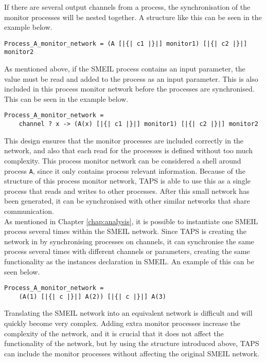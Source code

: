 If there are several output channels from a process, the synchronisation of the monitor processes will be nested together. A structure like this can be seen in the example below.
\begin{verbatim}
Process_A_monitor_network = (A [|{| c1 |}|] monitor1) [|{| c2 |}|] monitor2
\end{verbatim}
As mentioned above, if the SMEIL process contains an input parameter, the value must be read and added to the process as an input parameter. This is also included in this process monitor network before the processes are synchronised. This can be seen in the example below.
\begin{verbatim}
Process_A_monitor_network =
    channel ? x -> (A(x) [|{| c1 |}|] monitor1) [|{| c2 |}|] monitor2
\end{verbatim}
This design ensures that the monitor processes are included correctly in the network, and also that each read for the processes is defined without too much complexity. This process monitor network can be considered a shell around process \texttt{A}, since it only contains process relevant information. Because of the structure of this process monitor network, TAPS is able to use this as a single process that reads and writes to other processes. After this small network has been generated, it can be synchronised with other similar networks that share communication.\\

As mentioned in Chapter \ref{chap:analysis}, it is possible to instantiate one SMEIL process several times within the SMEIL network. Since TAPS is creating the network in \cspm{} by synchronising processes on channels, it can synchronise the same process several times with different channels or parameters, creating the same functionality as the instances declaration in SMEIL. An example of this can be seen below.\\ \begin{verbatim}
Process_A_monitor_network =
    (A(1) [|{| c |}|] A(2)) [|{| c |}|] A(3)
\end{verbatim}

Translating the SMEIL network into an equivalent \cspm{} network is difficult and will quickly become very complex. Adding extra monitor processes increase the complexity of the network, and it is crucial that it does not affect the functionality of the network, but by using the structure introduced above, TAPS can include the monitor processes without affecting the original SMEIL network.
